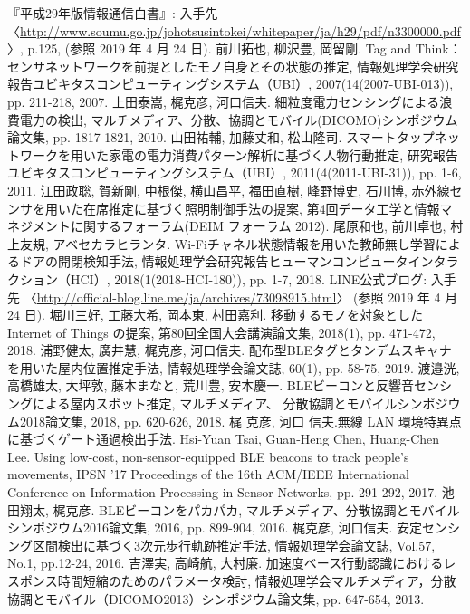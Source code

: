 \documentclass[Japanese]{dicomopapers}
\begin{document}
\begin{thebibliography}{20}
    『平成29年版情報通信白書』: 入手先 〈\url{http://www.soumu.go.jp/johotsusintokei/whitepaper/ja/h29/pdf/n3300000.pdf}〉, p.125, (参照 2019 年 4 月 24 日).
    前川拓也, 柳沢豊, 岡留剛. Tag and Think：センサネットワークを前提としたモノ自身とその状態の推定, 情報処理学会研究報告ユビキタスコンピューティングシステム（UBI）, 2007(14(2007-UBI-013)), pp. 211-218, 2007.
    上田泰嵩, 梶克彦, 河口信夫. 細粒度電力センシングによる浪費電力の検出, マルチメディア、分散、協調とモバイル(DICOMO)シンポジウム論文集, pp. 1817-1821, 2010.
    山田祐輔, 加藤丈和, 松山隆司. スマートタップネットワークを用いた家電の電力消費パターン解析に基づく人物行動推定, 研究報告ユビキタスコンピューティングシステム（UBI）, 2011(4(2011-UBI-31)), pp. 1-6, 2011.
    江田政聡, 賀新剛, 中根傑, 横山昌平, 福田直樹, 峰野博史, 石川博, 赤外線センサを用いた在席推定に基づく照明制御手法の提案, 第4回データ工学と情報マネジメントに関するフォーラム(DEIM フォーラム 2012).
    尾原和也, 前川卓也, 村上友規, アベセカラヒランタ. Wi-Fiチャネル状態情報を用いた教師無し学習によるドアの開閉検知手法, 情報処理学会研究報告ヒューマンコンピュータインタラクション（HCI）, 2018(1(2018-HCI-180)), pp. 1-7, 2018.
    LINE公式ブログ: 入手先 〈\url{http://official-blog.line.me/ja/archives/73098915.html}〉 (参照 2019 年 4 月 24 日).
    堀川三好, 工藤大希, 岡本東, 村田嘉利. 移動するモノを対象とした Internet of Things の提案, 第80回全国大会講演論文集, 2018(1), pp. 471-472, 2018.
    浦野健太, 廣井慧, 梶克彦, 河口信夫. 配布型BLEタグとタンデムスキャナを用いた屋内位置推定手法, 情報処理学会論文誌, 60(1), pp. 58-75, 2019.
    渡邉洸, 高橋雄太, 大坪敦, 藤本まなと, 荒川豊, 安本慶一. BLEビーコンと反響音センシングによる屋内スポット推定, マルチメディア、 分散協調とモバイルシンポジウム2018論文集, 2018, pp. 620-626, 2018.
    梶 克彦, 河口 信夫.無線 LAN 環境特異点に基づくゲート通過検出手法.
    Hsi-Yuan Tsai, Guan-Heng Chen, Huang-Chen Lee. Using low-cost, non-sensor-equipped BLE beacons to track people's movements, IPSN '17 Proceedings of the 16th ACM/IEEE International Conference on Information Processing in Sensor Networks, pp. 291-292, 2017.
    池田翔太, 梶克彦. BLEビーコンをパカパカ, マルチメディア、分散協調とモバイルシンポジウム2016論文集, 2016, pp. 899-904, 2016.
    梶克彦, 河口信夫. 安定センシング区間検出に基づく3次元歩行軌跡推定手法, 情報処理学会論文誌, Vol.57, No.1, pp.12-24, 2016.
    吉澤実, 高崎航, 大村廉. 加速度ベース行動認識におけるレスポンス時間短縮のためのパラメータ検討, 情報処理学会マルチメディア，分散協調とモバイル（DICOMO2013）シンポジウム論文集, pp. 647-654, 2013.
\end{thebibliography}
\end{document}
